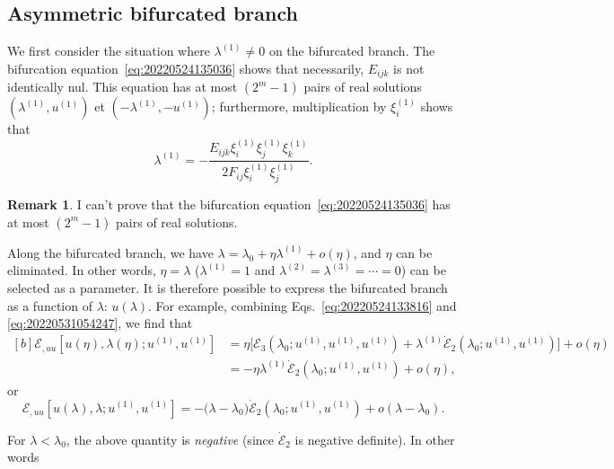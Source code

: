 \documentclass[12pt, final]{scrartcl}
\theoremstyle{definition}
\newtheorem{remark}{Remark}
\newcommand{\E}{\mathcal E}
\newcommand{\order}[2][1]{#2^{(#1)}}
\begin{document}
\subsection{Asymmetric bifurcated branch}

We first consider the situation where $\order[1]\lambda ≠ 0$ on the bifurcated
branch. The bifurcation equation~\eqref{eq:20220524135036} shows that
necessarily, $E_{ijk}$ is not identically nul. This equation has at most
$(2^m - 1)$ pairs of real solutions $(\order[1]\lambda, \order[1]u)$ et
$(- \order[1]\lambda, - \order[1]u)$; furthermore, multiplication by
$\order[1]{ξ_i}$ shows that
\begin{equation}
  \label{eq:20220801085236}
  \order[1]\lambda = -\frac{E_{ijk} \order[1]{ξ_i} \order[1]{ξ_j} \order[1]{ξ_k}}{2 F_{ij} \order[1]{ξ_i} \order[1]{ξ_j}}.
\end{equation}

\begin{remark}
  I can't prove that the bifurcation equation~\eqref{eq:20220524135036} has at
  most $(2^m - 1)$ pairs of real solutions.
\end{remark}

Along the bifurcated branch, we have $\lambda = \lambda_0 + η \order[1]\lambda + o(η)$, and $η$ can be
eliminated. In other words, $η=\lambda$ ($\order[1]\lambda=1$ and $\order[2]\lambda = \order[3]\lambda = \cdots = 0$) can
be selected as a parameter. It is therefore possible to express the bifurcated
branch as a function of $\lambda$: $u(\lambda)$. For example, combining
Eqs.~\eqref{eq:20220524133816} and \eqref{eq:20220531054247}, we find that
\begin{equation}
  \begin{aligned}[b]
    \E_{, uu}[u(η), \lambda(η); \order[1]u, \order[1]u]
    &= η \bigl[\E_3(\lambda_0 ; \order[1]u, \order[1]u, \order[1]u)  + \order[1]\lambda \dot{\E}_2(\lambda_0; \order[1]u, \order[1]u)\bigr] + o(η)\\
    &= - η \order[1]\lambda \dot{\E}_2(\lambda_0; \order[1]u, \order[1]u) + o(η),
  \end{aligned}
\end{equation}
or
\begin{equation}
  \label{eq:20220819160235}
  \E_{, uu}[u(\lambda), \lambda; \order[1]u, \order[1]u] = -\bigl( \lambda - \lambda_0 \bigr) \dot{\E}_2(\lambda_0; \order[1]u, \order[1]u) + o(\lambda - \lambda_0).
\end{equation}

For $\lambda < \lambda_0$, the above quantity is \emph{negative} (since $\dot{\E}_2$ is
negative definite). In other words
\end{document}
